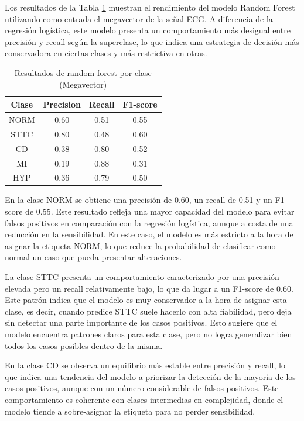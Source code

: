 \documentclass[12pt,a4paper,twoside]{book}
\begin{document}
Los resultados de la Tabla \ref{tab:metrics_clase_rf_mv} muestran el rendimiento del modelo Random Forest utilizando como entrada el megavector de la señal ECG. 
A diferencia de la regresión logística, este modelo presenta un comportamiento más desigual entre precisión y recall según la superclase, lo que indica una estrategia de decisión más conservadora en ciertas clases y más restrictiva en otras.

\begin{table}[H]
	\centering
	\begin{tabular}{|c|c|c|c|}
	\hline
	\textbf{Clase} & \textbf{Precision} & \textbf{Recall} & \textbf{F1-score} \\
	\hline
	NORM & 0.60 & 0.51 & 0.55 \\
	STTC & 0.80 & 0.48 & 0.60 \\
	CD   & 0.38 & 0.80 & 0.52 \\
	MI   & 0.19 & 0.88 & 0.31 \\
	HYP  & 0.36 & 0.79 & 0.50 \\
	\hline
	\end{tabular}
	\caption{Resultados de random forest por clase (Megavector)}
	\label{tab:metrics_clase_rf_mv}
\end{table}

En la clase NORM se obtiene una precisión de 0.60, un recall de 0.51 y un F1-score de 0.55. 
Este resultado refleja una mayor capacidad del modelo para evitar falsos positivos en comparación con la regresión logística, aunque a costa de una reducción en la sensibilidad. 
En este caso, el modelo es más estricto a la hora de asignar la etiqueta NORM, lo que reduce la probabilidad de clasificar como normal un caso que pueda presentar alteraciones.

La clase STTC presenta un comportamiento caracterizado por una precisión elevada pero un recall relativamente bajo, lo que da lugar a un F1-score de 0.60. 
Este patrón indica que el modelo es muy conservador a la hora de asignar esta clase, es decir, cuando predice STTC suele hacerlo con alta fiabilidad, pero deja sin detectar una parte importante de los casos positivos. 
Esto sugiere que el modelo encuentra patrones claros para esta clase, pero no logra generalizar bien todos los casos posibles dentro de la misma.

En la clase CD se observa un equilibrio más estable entre precisión y recall, lo que indica una tendencia del modelo a priorizar la detección de la mayoría de los casos positivos, aunque con un número considerable de falsos positivos. 
Este comportamiento es coherente con clases intermedias en complejidad, donde el modelo tiende a sobre-asignar la etiqueta para no perder sensibilidad.
\end{document}
